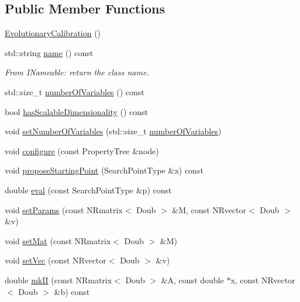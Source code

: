 \subsection*{\-Public \-Member \-Functions}
\begin{DoxyCompactItemize}
\item 
\hyperlink{struct_p_r_p_s_evolution_1_1_models_1_1_evolutionary_calibration_a7375734d251cd63c4475242e3651b63b}{\-Evolutionary\-Calibration} ()
\item 
std\-::string \hyperlink{struct_p_r_p_s_evolution_1_1_models_1_1_evolutionary_calibration_a3acaa04f259b75a5dc43a206b1060943}{name} () const 
\begin{DoxyCompactList}\small\item\em \-From \-I\-Nameable\-: return the class name. \end{DoxyCompactList}\item 
std\-::size\-\_\-t \hyperlink{struct_p_r_p_s_evolution_1_1_models_1_1_evolutionary_calibration_aa81f7e465db11bac69dfa0d542ef895e}{number\-Of\-Variables} () const 
\item 
bool \hyperlink{struct_p_r_p_s_evolution_1_1_models_1_1_evolutionary_calibration_a1f88db30ba2cd85a2074bd4702955923}{has\-Scalable\-Dimensionality} () const 
\item 
void \hyperlink{struct_p_r_p_s_evolution_1_1_models_1_1_evolutionary_calibration_af5bcd9e4565b8ad6df2606be58f17295}{set\-Number\-Of\-Variables} (std\-::size\-\_\-t \hyperlink{struct_p_r_p_s_evolution_1_1_models_1_1_evolutionary_calibration_aa81f7e465db11bac69dfa0d542ef895e}{number\-Of\-Variables})
\item 
void \hyperlink{struct_p_r_p_s_evolution_1_1_models_1_1_evolutionary_calibration_a1fcdcb29434052f199275acb66604db9}{configure} (const \-Property\-Tree \&node)
\item 
void \hyperlink{struct_p_r_p_s_evolution_1_1_models_1_1_evolutionary_calibration_ab1d36c1213c574b3c4ae834e0065499d}{propose\-Starting\-Point} (\-Search\-Point\-Type \&x) const 
\item 
double \hyperlink{struct_p_r_p_s_evolution_1_1_models_1_1_evolutionary_calibration_a3ed0ecd4c26571c67ff645c57b16c09a}{eval} (const \-Search\-Point\-Type \&p) const 
\item 
void \hyperlink{struct_p_r_p_s_evolution_1_1_models_1_1_evolutionary_calibration_a740048f0940d610576ed01555f5d09a4}{set\-Params} (const \-N\-Rmatrix$<$ \-Doub $>$ \&\-M, const \-N\-Rvector$<$ \-Doub $>$ \&v)
\item 
void \hyperlink{struct_p_r_p_s_evolution_1_1_models_1_1_evolutionary_calibration_a9ccabf28551278dd6e2c4531b3e967b8}{set\-Mat} (const \-N\-Rmatrix$<$ \-Doub $>$ \&\-M)
\item 
void \hyperlink{struct_p_r_p_s_evolution_1_1_models_1_1_evolutionary_calibration_a78084b91a2318eca69bb11f189c6c8af}{set\-Vec} (const \-N\-Rvector$<$ \-Doub $>$ \&v)
\item 
double \hyperlink{struct_p_r_p_s_evolution_1_1_models_1_1_evolutionary_calibration_a56996a4a6438cbe4071525d14409a49e}{mk\-I\-I} (const \-N\-Rmatrix$<$ \-Doub $>$ \&\-A, const double $\ast$x, const \-N\-Rvector$<$ \-Doub $>$ \&b) const 
\end{DoxyCompactItemize}


